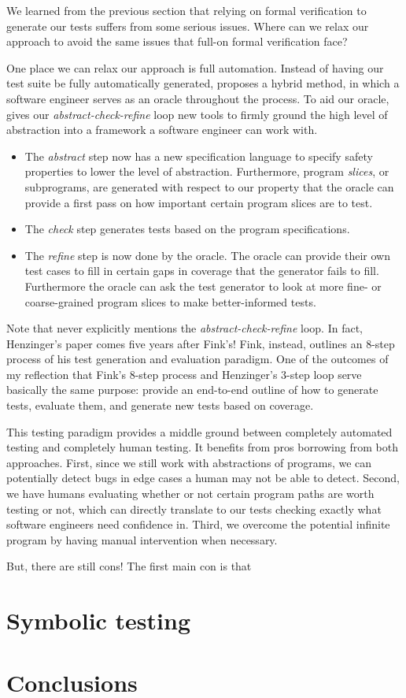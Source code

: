 \documentclass[acmsmall,review, nonacm]{acmart}
\begin{document}
We learned from the previous section that relying on formal verification to generate our tests suffers from some serious issues. Where can we relax our approach to avoid the same issues that full-on formal verification face?

One place we can relax our approach is full automation. Instead of having our test suite be fully automatically generated, \cite{fink1997property} proposes a hybrid method, in which a software engineer serves as an oracle throughout the process. To aid our oracle, \cite{fink1997property} gives our \textit{abstract-check-refine} loop new tools to firmly ground the high level of abstraction into a framework a software engineer can work with.

\begin{itemize}
  \item The \textit{abstract} step now has a new specification language to specify safety properties to lower the level of abstraction. Furthermore, program \textit{slices}, or subprograms, are generated with respect to our property that the oracle can provide a first pass on how important certain program slices are to test.
  \item The \textit{check} step generates tests based on the program specifications.
  \item The \textit{refine} step is now done by the oracle. The oracle can provide their own test cases to fill in certain gaps in coverage that the generator fails to fill. Furthermore the oracle can ask the test generator to look at more fine- or coarse-grained program slices to make better-informed tests.
\end{itemize}

Note that \cite{fink1997property} never explicitly mentions the \textit{abstract-check-refine} loop. In fact, Henzinger's paper comes five years after Fink's! Fink, instead, outlines an 8-step process of his test generation and evaluation paradigm. One of the outcomes of my reflection that Fink's 8-step process and Henzinger's 3-step loop serve basically the same purpose: provide an end-to-end outline of how to generate tests, evaluate them, and generate new tests based on coverage.

This testing paradigm provides a middle ground between completely automated testing and completely human testing. It benefits from pros borrowing from both approaches. First, since we still work with abstractions of programs, we can potentially detect bugs in edge cases a human may not be able to detect. Second, we have humans evaluating whether or not certain program paths are worth testing or not, which can directly translate to our tests checking exactly what software engineers need confidence in. Third, we overcome the potential infinite program by having manual intervention when necessary. 

But, there are still cons! The first main con is that 

\section{Symbolic testing}

\section{Conclusions}

\end{document}
